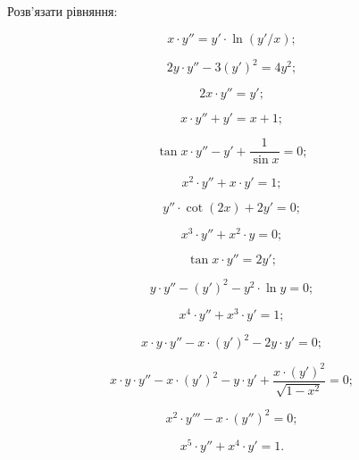 Розв’язати рівняння:
\begin{multicols}{2}
\begin{problem}
	\[x \cdot y'' = y' \cdot \ln (y'/x);\]
\end{problem}
\begin{problem}
	\[ 2 y \cdot y'' - 3 (y')^2 = 4 y^2;\]
\end{problem}
\begin{problem}
	\[2x \cdot y'' = y';\]
\end{problem}
\begin{problem}
	\[x \cdot y'' + y' = x + 1;\]
\end{problem}
\begin{problem}
	\[\tan x \cdot y'' - y' + \frac{1}{\sin x}=0;\]
\end{problem}
\begin{problem}
	\[x^2\cdot y''+x\cdot y'=1;\]
\end{problem}
\begin{problem}
	\[y'' \cdot \cot (2x) + 2y' = 0;\]
\end{problem}
\begin{problem}
	\[x^3 \cdot y'' + x^2 \cdot y = 0;\]
\end{problem}
\begin{problem}
	\[\tan x \cdot y'' = 2 y';\]
\end{problem}
\begin{problem}
	\[y \cdot y'' - (y')^2 - y^2 \cdot \ln y = 0;\]
\end{problem}
\begin{problem}
	\[x^4\cdot y''+x^3\cdot y'=1;\]
\end{problem}
\begin{problem}
	\[x\cdot y\cdot y''-x \cdot (y')^2 - 2 y \cdot y' = 0;\]
\end{problem}
\begin{problem}
	\[x\cdot y\cdot y''-x \cdot (y')^2 - y \cdot y'+\frac{x \cdot (y')^2}{\sqrt{1-x^2}}=0;\]
\end{problem}
\begin{problem}
	\[x^2\cdot y'''-x \cdot (y'')^2=0;\]
\end{problem}
\begin{problem}
	\[x^5\cdot y''+x^4 \cdot y'=1.\]
\end{problem}
\end{multicols}